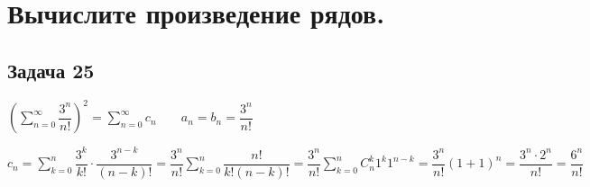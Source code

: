 \documentclass[a4paper,fleqn]{article}
\begin{document}
	
	
	\section*{Вычислите произведение рядов.}
	
	\subsection*{Задача 25}
	$ \left(\sum_{n = 0}^{\infty}\dfrac{3^n}{n!}\right)^2  = \sum_{n=0}^{\infty} c_n \;\;\;\;\;\;\; a_n = b_n = \dfrac{3^n}{n!}$
	
	$ c_n = \sum_{k=0}^{n} \dfrac{3^k}{k!}\cdot \dfrac{3^{n-k}}{(n-k)!} = \dfrac{3^n}{n!} \sum_{k=0}^{n}\dfrac{n!}{k!(n-k)!} = \dfrac{3^n}{n!}\sum_{k=0}^{n}C_n^k 1^k1^{n-k} = \dfrac{3^n}{n!}(1+1)^n = \dfrac{3^n \cdot 2^n}{n!}  = \dfrac{6^n}{n!}$
	
\end{document}
